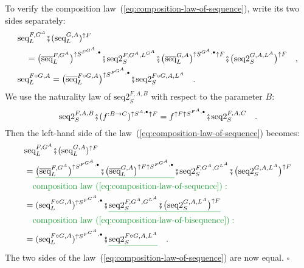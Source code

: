To verify the composition law~(\ref{eq:composition-law-of-sequence}),
write its two sides separately:
\begin{align*}
 & \text{seq}_{L}^{F,G^{A}}\bef(\text{seq}_{L}^{G,A})^{\uparrow F}\\
 & \quad=\big(\overline{\text{seq}}_{L}^{F,G^{A}}\big)^{\uparrow S^{F^{G^{A}},\bullet}}\bef\text{seq2}_{S}^{F,G^{A},L^{G^{A}}}\bef\big(\overline{\text{seq}}_{L}^{G,A}\big)^{\uparrow S^{G^{A},\bullet}\uparrow F}\bef\big(\text{seq2}_{S}^{G,A,L^{A}}\big)^{\uparrow F}\quad,\\
 & \text{seq}_{L}^{F\circ G,A}=\big(\overline{\text{seq}}_{L}^{F\circ G,A}\big)^{\uparrow S^{F^{G^{A}},\bullet}}\bef\text{seq2}_{S}^{F\circ G,A,L^{A}}\quad.
\end{align*}
We use the naturality law of $\text{seq2}_{S}^{F,A,B}$ with respect
to the parameter $B$:
\[
\text{seq2}_{S}^{F,A,B}\bef(f^{:B\rightarrow C})^{\uparrow S^{A,\bullet}\uparrow F}=f^{\uparrow F\uparrow S^{F^{A},\bullet}}\bef\text{seq2}_{S}^{F,A,C}\quad.
\]
Then the left-hand side of the law~(\ref{eq:composition-law-of-sequence})
becomes:
\begin{align*}
 & \text{seq}_{L}^{F,G^{A}}\bef(\text{seq}_{L}^{G,A})^{\uparrow F}\\
 & =\gunderline{\big(\overline{\text{seq}}_{L}^{F,G^{A}}\big)^{\uparrow S^{F^{G^{A}},\bullet}}\bef\big(\overline{\text{seq}}_{L}^{G,A}\big)^{\uparrow F\uparrow S^{F^{G^{A}},\bullet}}}\bef\text{seq2}_{S}^{F,G^{A},G^{L^{A}}}\bef\big(\text{seq2}_{S}^{G,A,L^{A}}\big)^{\uparrow F}\\
 & \quad{\color{greenunder}\text{composition law~(\ref{eq:composition-law-of-sequence})}:}\quad\\
 & =(\text{seq}_{L}^{F\circ G,A})^{\uparrow S^{F^{G^{A}},\bullet}}\bef\gunderline{\text{seq2}_{S}^{F,G^{A},G^{L^{A}}}\bef\big(\text{seq2}_{S}^{G,A,L^{A}}\big)^{\uparrow F}}\\
 & \quad{\color{greenunder}\text{composition law~(\ref{eq:composition-law-of-bisequence})}:}\quad\\
 & =(\text{seq}_{L}^{F\circ G,A})^{\uparrow S^{F^{G^{A}},\bullet}}\bef\gunderline{\text{seq2}_{S}^{F\circ G,A,L^{A}}}\quad.
\end{align*}
The two sides of the law~(\ref{eq:composition-law-of-sequence})
are now equal. $\square$

